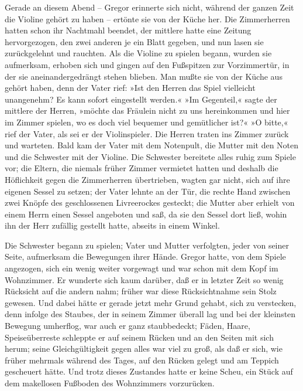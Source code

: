 Gerade an diesem Abend -- Gregor erinnerte sich nicht, während der
ganzen Zeit die Violine gehört zu haben -- ertönte sie von der Küche
her. Die Zimmerherren hatten schon ihr Nachtmahl beendet, der mittlere
hatte eine Zeitung hervorgezogen, den zwei anderen je ein Blatt gegeben,
und nun lasen sie zurückgelehnt und rauchten. Als die Violine zu spielen
begann, wurden sie aufmerksam, erhoben sich und gingen auf den
Fußspitzen zur Vorzimmertür, in der sie aneinandergedrängt stehen
blieben. Man mußte sie von der Küche aus gehört haben, denn der Vater
rief: »Ist den Herren das Spiel vielleicht unangenehm? Es kann sofort
eingestellt werden.« »Im Gegenteil,« sagte der mittlere der Herren,
»möchte das Fräulein nicht zu uns hereinkommen und hier im Zimmer
spielen, wo es doch viel bequemer und gemütlicher ist?« »O bitte,« rief
der Vater, als sei er der Violinspieler. Die Herren traten ins Zimmer
zurück und warteten. Bald kam der Vater mit dem Notenpult, die Mutter
mit den Noten und die Schwester mit der Violine. Die Schwester bereitete
alles ruhig zum Spiele vor; die Eltern, die niemals früher Zimmer
vermietet hatten und deshalb die Höflichkeit gegen die Zimmerherren
übertrieben, wagten gar nicht, sich auf ihre eigenen Sessel zu setzen;
der Vater lehnte an der Tür, die rechte Hand zwischen zwei Knöpfe des
geschlossenen Livreerockes gesteckt; die Mutter aber erhielt von einem
Herrn einen Sessel angeboten und saß, da sie den Sessel dort ließ, wohin
ihn der Herr zufällig gestellt hatte, abseits in einem Winkel.

Die Schwester begann zu spielen; Vater und Mutter verfolgten, jeder von
seiner Seite, aufmerksam die Bewegungen ihrer Hände. Gregor hatte, von
dem Spiele angezogen, sich ein wenig weiter vorgewagt und war schon mit
dem Kopf im Wohnzimmer. Er wunderte sich kaum darüber, daß er in letzter
Zeit so wenig Rücksicht auf die andern nahm; früher war diese
Rücksichtnahme sein Stolz gewesen. Und dabei hätte er gerade jetzt mehr
Grund gehabt, sich zu verstecken, denn infolge des Staubes, der in
seinem Zimmer überall lag und bei der kleinsten Bewegung umherflog, war
auch er ganz staubbedeckt; Fäden, Haare, Speiseüberreste schleppte er
auf seinem Rücken und an den Seiten mit sich herum; seine
Gleichgültigkeit gegen alles war viel zu groß, als daß er sich, wie
früher mehrmals während des Tages, auf den Rücken gelegt und am Teppich
gescheuert hätte. Und trotz dieses Zustandes hatte er keine Scheu, ein
Stück auf dem makellosen Fußboden des Wohnzimmers vorzurücken.

